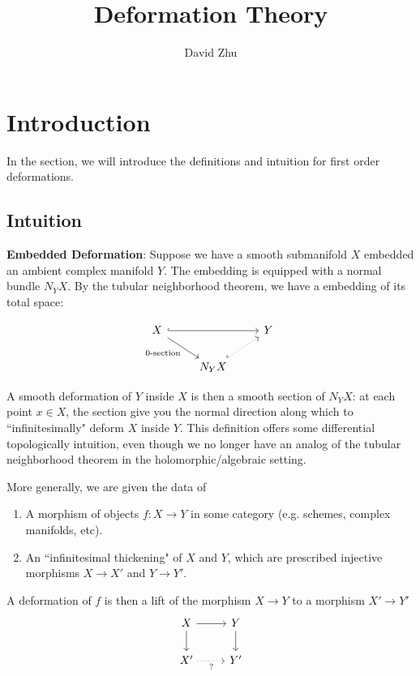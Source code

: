 \documentclass{article}
\title{Deformation Theory}
\author{David Zhu}
\theoremstyle{definition}
\theoremstyle{definition}
\theoremstyle{definition}
\theoremstyle{definition}
\theoremstyle{definition}
\theoremstyle{definition}
\theoremstyle{definition}
\begin{document}
\maketitle


\tableofcontents

\newpage



\section{Introduction}
In the section, we will introduce the definitions and intuition for first order deformations. 

\subsection{Intuition}
\textbf{Embedded Deformation}: Suppose we have a smooth submanifold $X$ embedded an ambient complex manifold $Y$. The embedding is equipped with a normal bundle $N_YX$. By the tubular neighborhood theorem, we have a embedding of its total space: 

\[\begin{tikzcd}
	X && Y \\
	& {N_YX}
	\arrow[hook, from=1-1, to=1-3]
	\arrow["{\textrm{0-section}}"', from=1-1, to=2-2]
	\arrow[dotted, hook, from=2-2, to=1-3]
\end{tikzcd}\]

A smooth deformation of $Y$ inside $X$ is then a smooth section of $N_YX$: at each point $x\in X$, the section give you the normal direction along which to ``infinitesimally" deform $X$ inside $Y$. This definition offers some differential topologically intuition, even though we no longer have an analog of the tubular neighborhood theorem in the holomorphic/algebraic setting.

More generally, we are given the data of 
\begin{enumerate}
    \item A morphism of objects $f: X\to Y$ in some category (e.g. schemes, complex manifolds, etc).
    \item An ``infinitesimal thickening" of $X$ and $Y$, which are prescribed injective morphisms $X\to X'$ and $Y\to Y'$.
\end{enumerate}

A deformation of $f$ is then a lift of the morphism $X\to Y$ to a morphism $X'\to Y'$
\[\begin{tikzcd}
	X & Y \\
	{X'} & {Y'}
	\arrow[from=1-1, to=1-2]
	\arrow[from=1-1, to=2-1]
	\arrow[from=1-2, to=2-2]
	\arrow["{?}"', dotted, from=2-1, to=2-2]
\end{tikzcd}\]
\end{document}
